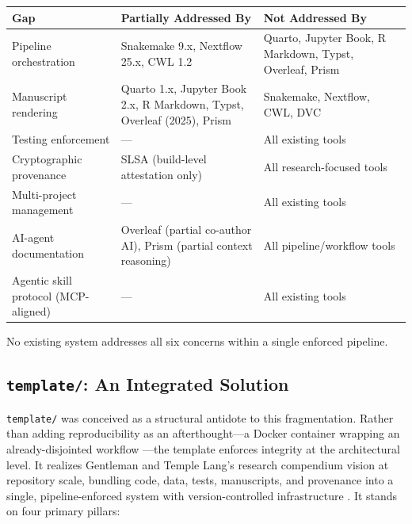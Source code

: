 \documentclass[
]{article}
\newcounter{none} %
\begin{document}
{\def\LTcaptype{none} %
\begin{longtable}[]{@{}
  >{\raggedright\arraybackslash}p{}
  >{\raggedright\arraybackslash}p{}
  >{\raggedright\arraybackslash}p{}@{}}
\toprule\noalign{}
\begin{minipage}[b]{\linewidth}\raggedright
Gap
\end{minipage} & \begin{minipage}[b]{\linewidth}\raggedright
Partially Addressed By
\end{minipage} & \begin{minipage}[b]{\linewidth}\raggedright
Not Addressed By
\end{minipage} \\
\midrule\noalign{}
\endhead
\bottomrule\noalign{}
\endlastfoot
Pipeline orchestration & Snakemake 9.x, Nextflow 25.x, CWL 1.2 & Quarto,
Jupyter Book, R Markdown, Typst, Overleaf, Prism \\
Manuscript rendering & Quarto 1.x, Jupyter Book 2.x, R Markdown, Typst,
Overleaf (2025), Prism & Snakemake, Nextflow, CWL, DVC \\
Testing enforcement & --- & All existing tools \\
Cryptographic provenance & SLSA (build-level attestation only) & All
research-focused tools \\
Multi-project management & --- & All existing tools \\
AI-agent documentation & Overleaf (partial co-author AI), Prism (partial
context reasoning) & All pipeline/workflow tools \\
Agentic skill protocol (MCP-aligned) & --- & All existing tools \\
\end{longtable}
}

No existing system addresses all six concerns within a single enforced
pipeline.

\subsection{\texorpdfstring{\texttt{template/}: An Integrated
Solution}{template/: An Integrated Solution}}\label{template-an-integrated-solution}

\texttt{template/} was conceived as a structural antidote to this
fragmentation. Rather than adding reproducibility as an afterthought---a
Docker container wrapping an already-disjointed workflow
\citep{boettiger2015docker}---the template enforces integrity at the
architectural level. It realizes Gentleman and Temple Lang's research
compendium vision \citep{gentleman2007research} at repository scale,
bundling code, data, tests, manuscripts, and provenance into a single,
pipeline-enforced system with version-controlled infrastructure
\citep{ram2013git}. It stands on four primary pillars:
\end{document}
